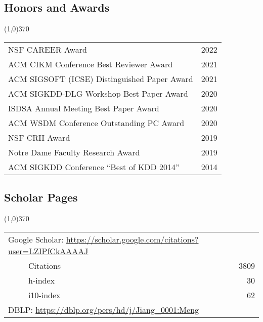 \documentclass[10pt]{article}
\begin{document}
\vspace{-0.6cm}
\subsection{\sc Honors and Awards}
\vspace{-0.4cm} \line(1,0){370} \vspace{-0.1cm}

\begin{table}[h!]
\begin{tabular*}{12.7cm}{p{11.65cm}r}
NSF CAREER Award & 2022 \\
ACM CIKM Conference Best Reviewer Award & 2021 \\	
ACM SIGSOFT (ICSE) Distinguished Paper Award & 2021 \\
ACM SIGKDD-DLG Workshop Best Paper Award & 2020 \\
ISDSA Annual Meeting Best Paper Award & 2020 \\
ACM WSDM Conference Outstanding PC Award & 2020 \\
NSF CRII Award & 2019 \\
Notre Dame Faculty Research Award & 2019 \\
ACM SIGKDD Conference ``Best of KDD 2014'' & 2014 \\
\end{tabular*}
\end{table}

\vspace{-0.6cm}
\subsection{\sc Scholar Pages}
\vspace{-0.4cm} \line(1,0){370} \vspace{-0.1cm}

\begin{table}[h!]
\begin{tabular*}{12.7cm}{p{11.65cm}r}
\multicolumn{2}{l}{Google Scholar: \url{https://scholar.google.com/citations?user=LZIPfCkAAAAJ}} \\
~~~~~Citations & 3809 \\
~~~~~h-index & 30 \\
~~~~~i10-index & 62 \\
\multicolumn{2}{l}{DBLP: \url{https://dblp.org/pers/hd/j/Jiang\_0001:Meng}} \\
\end{tabular*}
\end{table}
\end{document}
